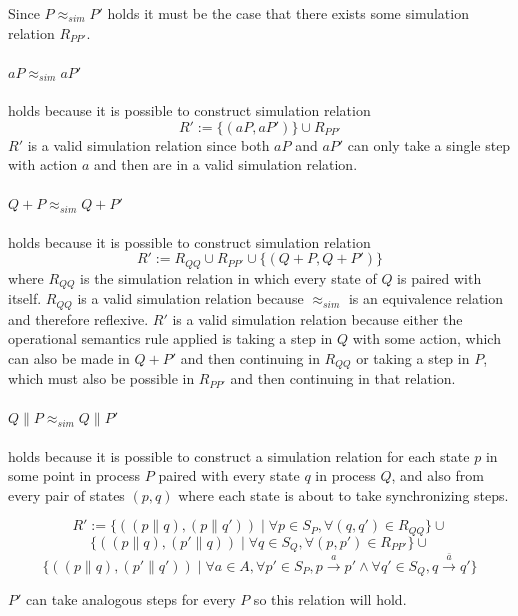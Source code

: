 \documentclass{article}
\begin{document}
Since $P \approx_{sim} P'$ holds it must be the case that there exists some simulation relation $R_{PP'}$.
\paragraph{$aP \approx_{sim} aP'$} holds because it is possible to construct simulation relation
$$R':= \{(aP, aP')\} \cup R_{PP'}$$
$R'$ is a valid simulation relation since both $aP$ and $aP'$ can only take a single step with action $a$ and then are in a valid simulation relation.
\paragraph{$Q + P \approx_{sim} Q + P'$} holds because it is possible to construct simulation relation
$$R':= R_{QQ} \cup R_{PP'} \cup \{(Q + P, Q + P')\}$$
where $R_{QQ}$ is the simulation relation in which every state of $Q$ is paired with itself.
$R_{QQ}$ is a valid simulation relation because $\approx_{sim}$ is an equivalence relation and therefore reflexive.
$R'$ is a valid simulation relation because either the operational semantics rule applied is taking a step in $Q$ with some action, which can also be made in $Q + P'$ and then continuing in $R_{QQ}$ or taking a step in $P$, which must also be possible in $R_{PP'}$ and then continuing in that relation.

\paragraph{$Q \parallel P \approx_{sim} Q \parallel P'$} holds because it is possible to construct a simulation relation for each state $p$ in some point in process $P$ paired with every state $q$ in process $Q$, and also from every pair of states $(p,q)$ where each state is about to take synchronizing steps.

$$
R' := 
\{((p \parallel q), (p \parallel q'))\mid \forall p \in S_P, \forall (q,q') \in R_{QQ}\} \cup$$
$$\{((p \parallel q), (p' \parallel q))\mid \forall q \in S_Q, \forall (p,p') \in R_{PP'}\} \cup $$
$$\{ ((p \parallel q), (p' \parallel q')) \mid \forall a \in A, \forall p' \in S_P, p\xrightarrow{a}  p'\wedge \forall q' \in S_Q, q\xrightarrow{\bar{a}} q' \}
$$

$P'$ can take analogous steps for every $P$ so this relation will hold.
\end{document}
